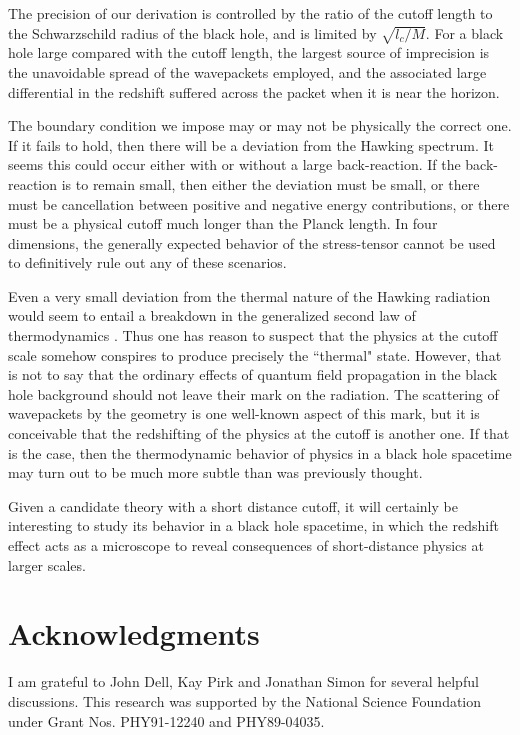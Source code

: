 The precision of our derivation is controlled by the
ratio of the cutoff length to the Schwarzschild radius
of the black hole, and is limited by $\sqrt{l_c/M}$.
For a black hole large compared with
the cutoff length, the largest source of imprecision
is the unavoidable spread of the wavepackets employed,
and the associated large differential in the redshift suffered
across the packet when it is near the horizon.

The boundary condition we impose may
or may not be physically the correct one.
If it fails to hold, then there will be a deviation from
the Hawking spectrum. It seems this could occur either with or without
a large back-reaction. If the back-reaction is to remain small,
then either the deviation must be small, or there must be cancellation
between positive and negative energy contributions, or there must
be a physical cutoff much longer than the Planck length.
In four dimensions, the generally expected behavior of the
stress-tensor cannot be used to definitively
rule out any of these scenarios.

Even a very small deviation from the
thermal nature of the Hawking radiation would seem to entail a
breakdown in the generalized second law of
thermodynamics \cite{Beck,UnWald,ThorneZurek}.
Thus one has reason to suspect that the
physics at the cutoff scale somehow conspires to
produce precisely the ``thermal" state. However, that is not
to say that the ordinary effects of quantum field
propagation in the black hole background should not
leave their mark on the radiation. The scattering of
wavepackets by
the geometry is one well-known aspect of this mark,
but it is conceivable that the redshifting of the
physics at the cutoff is another one. If that is the
case, then the thermodynamic behavior of physics in a
black hole spacetime may turn out to be much more
subtle than was previously thought.

Given a candidate theory with a short distance cutoff,
it will certainly be interesting to study its behavior
in a black hole spacetime, in which the redshift
effect acts as a microscope to reveal consequences of
short-distance physics at larger scales.

\section*{Acknowledgments}

I am grateful to John Dell, Kay Pirk and Jonathan Simon for several
helpful discussions. This research was supported by
the National Science Foundation under Grant Nos. PHY91-12240
and PHY89-04035.

